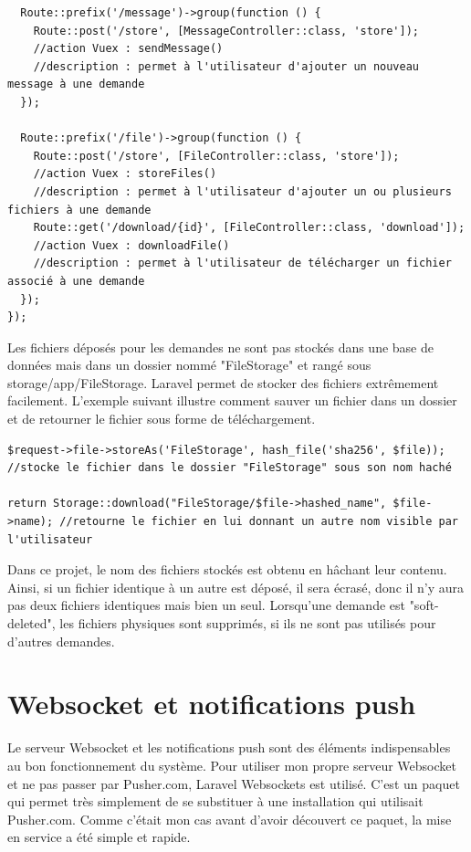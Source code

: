 \documentclass[
    iai, %
    eai, %
]{heig-tb}
\begin{document}
\begin{verbatim}
  Route::prefix('/message')->group(function () {
    Route::post('/store', [MessageController::class, 'store']);
    //action Vuex : sendMessage()
    //description : permet à l'utilisateur d'ajouter un nouveau message à une demande
  });

  Route::prefix('/file')->group(function () {
    Route::post('/store', [FileController::class, 'store']);
    //action Vuex : storeFiles()
    //description : permet à l'utilisateur d'ajouter un ou plusieurs fichiers à une demande
    Route::get('/download/{id}', [FileController::class, 'download']);
    //action Vuex : downloadFile()
    //description : permet à l'utilisateur de télécharger un fichier associé à une demande
  });
});
\end{verbatim}

Les fichiers déposés pour les demandes ne sont pas stockés dans une base de données mais dans un dossier nommé "FileStorage" et rangé sous storage/app/FileStorage. Laravel permet de stocker des fichiers extrêmement facilement. L'exemple suivant illustre comment sauver un fichier dans un dossier et de retourner le fichier sous forme de téléchargement.

\begin{verbatim}
$request->file->storeAs('FileStorage', hash_file('sha256', $file)); //stocke le fichier dans le dossier "FileStorage" sous son nom haché

return Storage::download("FileStorage/$file->hashed_name", $file->name); //retourne le fichier en lui donnant un autre nom visible par l'utilisateur
\end{verbatim}

Dans ce projet, le nom des fichiers stockés est obtenu en hâchant leur contenu. Ainsi, si un fichier identique à un autre est déposé, il sera écrasé, donc il n'y aura pas deux fichiers identiques mais bien un seul. Lorsqu'une demande est "soft-deleted", les fichiers physiques sont supprimés, si ils ne sont pas utilisés pour d'autres demandes.

\section{Websocket et notifications push}
Le serveur Websocket et les notifications push sont des éléments indispensables au bon fonctionnement du système. Pour utiliser mon propre serveur Websocket et ne pas passer par Pusher.com, Laravel Websockets est utilisé. C'est un paquet qui permet très simplement de se substituer à une installation qui utilisait Pusher.com. Comme c'était mon cas avant d'avoir découvert ce paquet, la mise en service a été simple et rapide.
\end{document}

